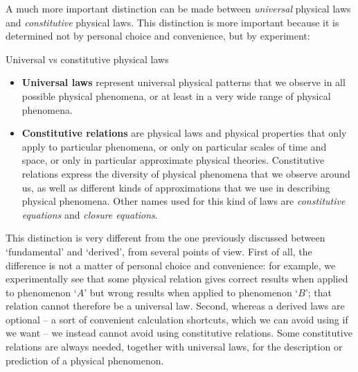 \documentclass[a4paper,12pt,%
onecolumn,oneside,%
british%
]{memoir}
\renewcommand*{\|}[1][]{\nonscript\:#1\vert\nonscript\:\mathopen{}}
\begin{document}
A much more important distinction can be made between \emph{universal} physical laws and \emph{constitutive} physical laws. This distinction is more important because it  is determined not by personal choice and convenience, but by experiment:
\begin{definition}{Universal vs constitutive physical laws}
  \begin{itemize}
  \item\textbf{Universal laws} represent universal physical patterns that we observe in all possible physical phenomena, or at least in a very wide range of physical phenomena.

  \item\textbf{Constitutive relations} are physical laws and physical properties that only apply to particular phenomena, or only on particular scales of time and space, or only in particular approximate physical theories. Constitutive relations express the diversity of physical phenomena that we observe around us, as well as different kinds of approximations that we use in describing physical phenomena. Other names used for this kind of laws are \emph{constitutive equations} and \emph{closure equations}.
  \end{itemize}
\end{definition}

This distinction is very different from the one previously discussed between \enquote*{fundamental} and \enquote*{derived}, from several points of view. First of all, the difference is not a matter of personal choice and convenience: for example, we experimentally see that some physical relation gives correct results when applied to phenomenon \enquote*{$A$} but wrong results when applied to phenomenon \enquote*{$B$}; that relation cannot therefore be a universal law. Second, whereas a derived laws are optional -- a sort of convenient calculation shortcuts, which we can avoid using if we want -- we instead cannot avoid using constitutive relations. Some constitutive relations are always needed, together with universal laws, for the description or prediction of a physical phenomenon.

\end{document}
